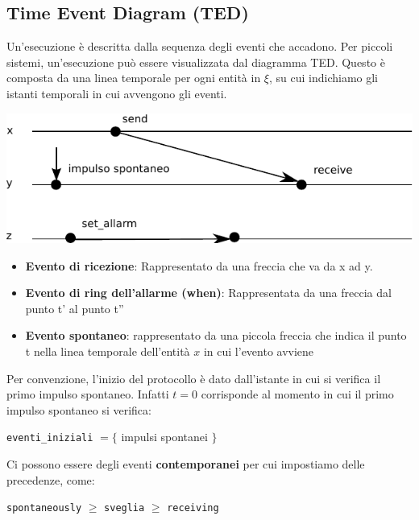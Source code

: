 \subsection*{Time Event Diagram (TED)}
Un'esecuzione è descritta dalla sequenza degli eventi che accadono. Per piccoli sistemi, un'esecuzione può essere visualizzata dal diagramma TED. Questo è composta da una linea temporale per ogni entità in $\xi$, su cui indichiamo gli istanti temporali in cui avvengono gli eventi.
\begin{center}
  \includegraphics[scale=0.8]{images/n_07}
\end{center}

\begin{itemize}
    \item \textbf{Evento di ricezione}: Rappresentato da una freccia che va da x ad y.
    \item \textbf{Evento di ring dell'allarme (when)}: Rappresentata da una freccia dal punto t' al punto t''
    \item \textbf{Evento spontaneo}: rappresentato da una piccola freccia che indica il punto t nella linea temporale dell'entità $x$ in cui l'evento avviene
\end{itemize}

Per convenzione, l'inizio del protocollo è dato dall'istante in cui si verifica il primo impulso spontaneo. Infatti $t=0$ corrisponde al momento in cui il primo impulso spontaneo si verifica:
\begin{center}
  \texttt{eventi\_iniziali} $=\lbrace$ impulsi spontanei $\rbrace$
\end{center}
Ci possono essere degli eventi \textbf{contemporanei} per cui impostiamo delle precedenze, come:
\begin{center}
  \texttt{spontaneously} $\geq$ \texttt{sveglia} $\geq$ \texttt{receiving}
\end{center}

